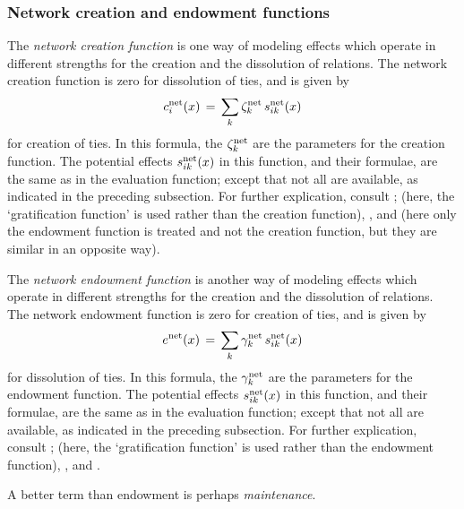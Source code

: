 \documentclass[a4paper,fleqn,11pt]{article}
\newcommand{\+}{\, + \,}
\begin{document}
\subsubsection{Network creation and endowment functions}
\label{S_c}
\label{S_e}

The \emph{network creation function}
is one way of modeling effects which operate in
different strengths for the creation and the dissolution of
relations.
The network creation function is zero for dissolution of ties,
and is given by
\begin{equation}
c^{\rm net}_i(x) \, = \, \sum_k \zeta_k^{\rm net} \, s^{\rm net}_{ik}(x)
                             \label{c_net}
\end{equation}
for creation of ties.
In this formula, the $\zeta_k^{\rm net}$
are the parameters for the creation function.
The potential effects $s^{\rm net}_{ik}(x) $ in this function, and their
formulae, are the same as in the evaluation function;
except that not all are available, as indicated in the preceding subsection.
For further explication, consult \citet{Snijders01, Snijders05};
(here, the `gratification function' is used rather than the creation function),
\citet*{SnijdersEA07}, and \citet*{SteglichEA10}
(here only the endowment function is treated and not the creation function,
but they are similar in an opposite way).

The \emph{network endowment function}
is another way of modeling effects which operate in
different strengths for the creation and the dissolution of
relations.
The network endowment function is zero for creation of ties,
and is given by
\begin{equation}
e^{\rm net}(x) \, = \, \sum_k \gamma^{\rm net}_k \, s^{\rm net}_{ik}(x)
                                                           \label{e_net}
\end{equation}
for dissolution of ties.
In this formula, the $\gamma_k^{\rm net}$
are the parameters for the endowment function.
The potential effects $s^{\rm net}_{ik}(x) $ in this function, and their
formulae, are the same as in the evaluation function;
except that not all are available, as indicated in the preceding subsection.
For further explication, consult \citet{Snijders01, Snijders05};
(here, the `gratification function' is used rather than the endowment function),
\citet*{SnijdersEA07}, and \citet*{SteglichEA10}.

A better term than endowment is perhaps \emph{maintenance}.
\end{document}

